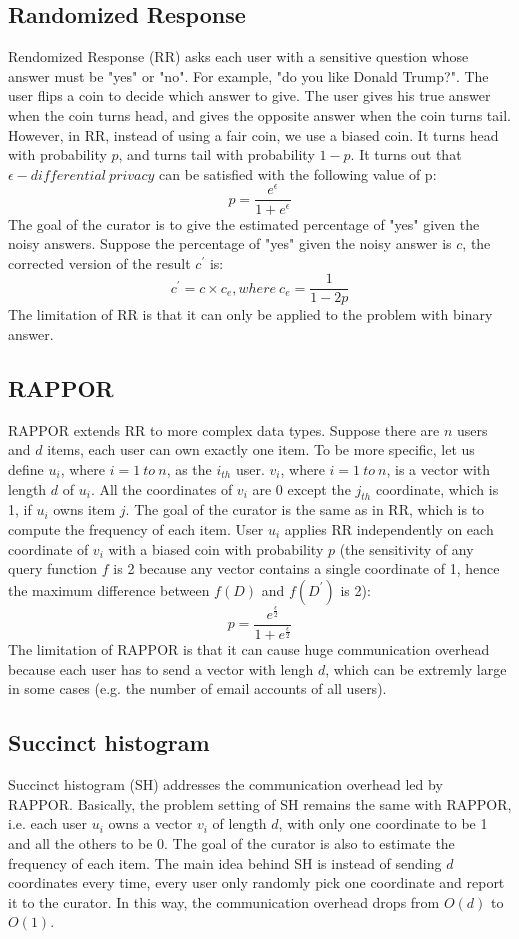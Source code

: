 \documentclass[a4paper, 11pt]{article} %
\begin{document}
\subsection{Randomized Response}
Rendomized Response (RR)\cite{erlingsson2014rappor} asks each user with a sensitive question whose answer must be "yes" or "no". For example, "do you like Donald Trump?". The user flips a coin to decide which answer to give. The user gives his true answer when the coin turns head, and gives the opposite answer when the coin turns tail. However, in RR, instead of using a fair coin, we use a biased coin. It turns head with probability $p$, and turns tail with probability $1-p$. It turns out that $\epsilon - differential \ privacy$ can be satisfied with the following value of p:
\[ p = \frac{e^\epsilon}{1+e^\epsilon} \]
The goal of the curator is to give the estimated percentage of "yes" given the noisy answers. Suppose the percentage of "yes" given the noisy answer is $c$, the corrected version of the result $c^\prime$ is:
\[ c^\prime = c \times c_{e}, where \ c_{e} = \frac{1}{1-2p}\]
The limitation of RR is that it can only be applied to the problem with binary answer.
\subsection{RAPPOR}
RAPPOR\cite{erlingsson2014rappor,fanti2016building} extends RR\cite{erlingsson2014rappor} to more complex data types. Suppose there are $n$ users and $d$ items, each user can own exactly one item. To be more specific, let us define $u_i$, where $i=1 \ to \ n$, as the $i_{th}$ user. $v_i$, where $i=1 \ to \ n$, is a vector with length $d$ of $u_i$. All the coordinates of $v_i$ are 0 except the $j_{th}$ coordinate, which is 1, if $u_i$ owns item $j$. The goal of the curator is the same as in RR, which is to compute the frequency of each item. User $u_i$ applies RR independently on each coordinate of $v_i$ with a biased coin with probability $p$ (the sensitivity of any query function $f$ is 2 because any vector contains a single coordinate of 1, hence the maximum difference between $f(D)$ and $f(D^\prime)$ is 2):
\[ p = \frac{e^{\frac{\epsilon}{2}}}{1+e^{\frac{\epsilon}{2}}} \]
The limitation of RAPPOR is that it can cause huge communication overhead because each user has to send a vector with lengh $d$, which can be extremly large in some cases (e.g. the number of email accounts of all users).

\subsection{Succinct histogram}
Succinct histogram (SH)\cite{bassily2015local} addresses the communication overhead led by RAPPOR\cite{erlingsson2014rappor,fanti2016building}. Basically, the problem setting of SH remains the same with RAPPOR, i.e. each user $u_i$ owns a vector $v_i$ of length $d$, with only one coordinate to be 1 and all the others to be 0. The goal of the curator is also to estimate the frequency of each item. The main idea behind SH is instead of sending $d$ coordinates every time, every user only randomly pick one coordinate and report it to the curator. In this way, the communication overhead drops from $O(d)$ to $O(1)$.
\end{document}
